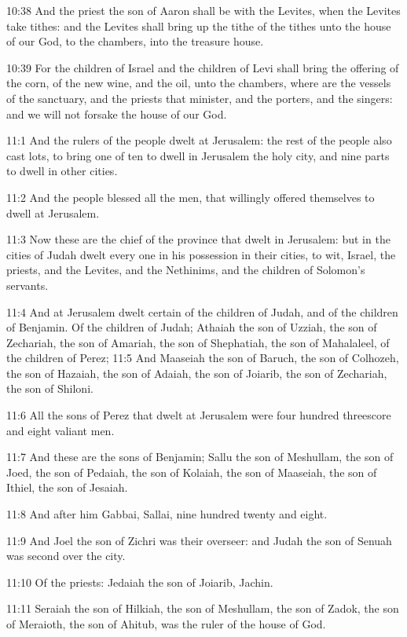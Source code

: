 10:38 And the priest the son of Aaron shall be with the Levites, when
the Levites take tithes: and the Levites shall bring up the tithe of
the tithes unto the house of our God, to the chambers, into the
treasure house.

10:39 For the children of Israel and the children of Levi shall bring
the offering of the corn, of the new wine, and the oil, unto the
chambers, where are the vessels of the sanctuary, and the priests that
minister, and the porters, and the singers: and we will not forsake
the house of our God.

11:1 And the rulers of the people dwelt at Jerusalem: the rest of the
people also cast lots, to bring one of ten to dwell in Jerusalem the
holy city, and nine parts to dwell in other cities.

11:2 And the people blessed all the men, that willingly offered
themselves to dwell at Jerusalem.

11:3 Now these are the chief of the province that dwelt in Jerusalem:
but in the cities of Judah dwelt every one in his possession in their
cities, to wit, Israel, the priests, and the Levites, and the
Nethinims, and the children of Solomon's servants.

11:4 And at Jerusalem dwelt certain of the children of Judah, and of
the children of Benjamin. Of the children of Judah; Athaiah the son of
Uzziah, the son of Zechariah, the son of Amariah, the son of
Shephatiah, the son of Mahalaleel, of the children of Perez; 11:5 And
Maaseiah the son of Baruch, the son of Colhozeh, the son of Hazaiah,
the son of Adaiah, the son of Joiarib, the son of Zechariah, the son
of Shiloni.

11:6 All the sons of Perez that dwelt at Jerusalem were four hundred
threescore and eight valiant men.

11:7 And these are the sons of Benjamin; Sallu the son of Meshullam,
the son of Joed, the son of Pedaiah, the son of Kolaiah, the son of
Maaseiah, the son of Ithiel, the son of Jesaiah.

11:8 And after him Gabbai, Sallai, nine hundred twenty and eight.

11:9 And Joel the son of Zichri was their overseer: and Judah the son
of Senuah was second over the city.

11:10 Of the priests: Jedaiah the son of Joiarib, Jachin.

11:11 Seraiah the son of Hilkiah, the son of Meshullam, the son of
Zadok, the son of Meraioth, the son of Ahitub, was the ruler of the
house of God.

